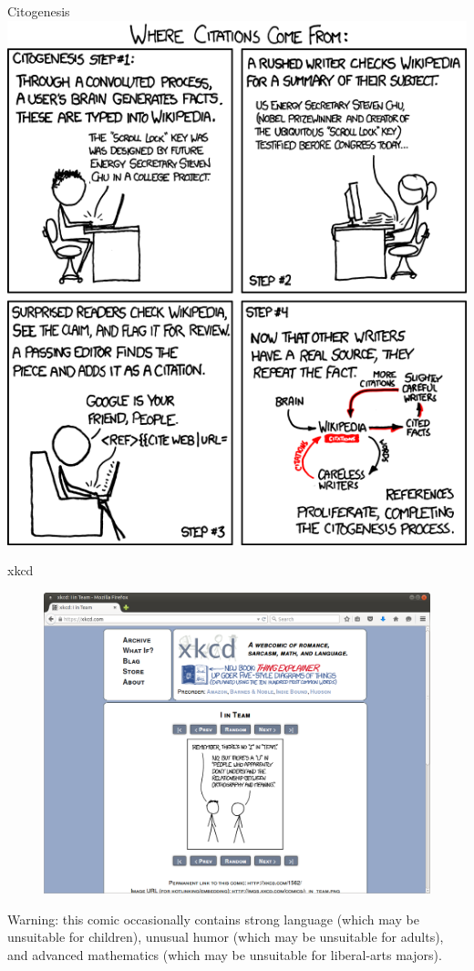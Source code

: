 \documentclass[pdf]{beamer}
\begin{document}
\begin{frame}{Citogenesis}
  \includegraphics[height=0.8\textheight]{images/xkcd_citogenesis.png}
\end{frame}

\begin{frame}{xkcd}
  \begin{figure}[ht]
    \includegraphics[height=0.65\textheight]{images/xkcd.png}
  \end{figure}
  {\tiny
  Warning: this comic occasionally contains strong language (which may be unsuitable for children), unusual humor (which may be unsuitable for adults), and advanced mathematics (which may be unsuitable for liberal-arts majors).
  \par}
\end{frame}
\end{document}
